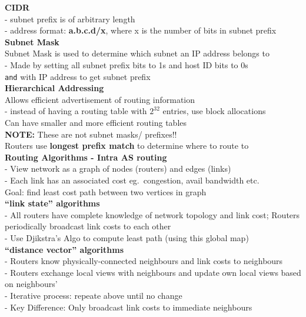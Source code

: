 \documentclass[10pt, a4paper]{article}
\newcommand{\highlight}[1]{{\color{red}\textbf{#1}}}
\newcommand{\blue}[1]{{\color{MidnightBlue}#1}}
\newcommand{\red}[1]{{\color{red}#1}}
\begin{document}
\begin{multicols*}{3}
		\textbf{CIDR}\\
		- subnet prefix is of arbitrary length\\
		- address format: \highlight{a.b.c.d/x}, where x is the number of bits in subnet prefix\\

		\textbf{Subnet Mask}\\
		\red{Subnet Mask} is used to determine which subnet an IP address belongs to\\
		- Made by setting all subnet prefix bits to 1s and host ID bits to 0s\\
		\texttt{and} with IP address to get subnet prefix\\

		\textbf{Hierarchical Addressing}\\
		Allows efficient advertisement of routing information\\
		- instead of having a routing table with $2^{32}$ entries, use block allocations\\
		Can have smaller and more efficient routing tables\\
		\highlight{NOTE:} These are not subnet masks/ prefixes!!\\
		Routers use \highlight{longest prefix match} to determine where to route to\\

		\textbf{Routing Algorithms - Intra AS routing}\\
		- View network as a graph of nodes (routers) and edges (links)\\
		- Each link has an associated cost eg.\ congestion, avail bandwidth etc.\\
		\red{Goal:} find least cost path between two vertices in graph\\

		\textbf{``link state'' algorithms}\\
		- All routers have complete knowledge of network topology and link cost; Routers periodically broadcast link costs to each other\\
		- Use Djikstra's Algo to compute least path (using this global map)\\

		\textbf{``distance vector'' algorithms}\\
		- Routers know physically-connected neighbours and link costs to neighbours\\
		- Routers \blue{exchange} local views with neighbours and update own local views based on neighbours'\\
		- Iterative process: repeate above until no change\\
		- \blue{Key Difference:} Only broadcast link costs to immediate neighbours\\


\end{multicols*}
\end{document}
